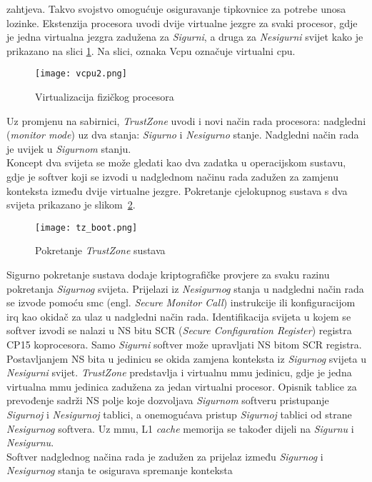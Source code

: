 \documentclass[times, utf8, diplomski, numeric]{fer}
\begin{document}
zahtjeva. Takvo svojstvo omogućuje osiguravanje tipkovnice za potrebe unosa lozinke. Ekstenzija procesora uvodi dvije virtualne
jezgre za svaki procesor, gdje je jedna virtualna jezgra zadužena za \textit{Sigurni}, a druga za \textit{Nesigurni} svijet kako je prikazano na
slici \ref{vcpu}. Na slici, oznaka V\gls{cpu} označuje virtualni \gls{cpu}.
\begin{figure}[H]
  \centering
	\texttt{[image: vcpu2.png]}%
	\caption{Virtualizacija fizičkog procesora}
	\label{vcpu}%
\end{figure}
Uz promjenu na
sabirnici, \textit{TrustZone} uvodi i novi način rada procesora: nadgledni (\textit{monitor mode}) uz dva stanja: \textit{Sigurno}
i \textit{Nesigurno} stanje. Nadgledni način rada je uvijek u \textit{Sigurnom} stanju.\\
Koncept dva svijeta se može gledati kao dva zadatka u operacijskom sustavu, gdje je softver koji se izvodi
u nadglednom načinu rada zadužen za zamjenu konteksta između dvije virtualne jezgre. Pokretanje cjelokupnog sustava s dva
svijeta prikazano je slikom~\ref{tz_boot}.
\begin{figure}[H]
  \centering
	\texttt{[image: tz\_boot.png]}%
	\caption{Pokretanje \textit{TrustZone} sustava}
	\label{tz_boot}%
\end{figure}
Sigurno pokretanje sustava dodaje kriptografičke provjere za svaku razinu pokretanja \textit{Sigurnog} svijeta.
Prijelazi iz \textit{Nesigurnog} stanja u nadgledni
način rada se izvode pomoću \gls{smc} (engl. \textit{Secure Monitor Call}) instrukcije ili konfiguracijom \gls{irq} kao okidač za ulaz
u nadgledni način rada. Identifikacija svijeta u kojem se softver izvodi se nalazi u NS bitu SCR (\textit{Secure
Configuration Register}) registra CP15 koprocesora. Samo \textit{Sigurni} softver može upravljati NS bitom SCR registra. Postavljanjem
NS bita u jedinicu se okida zamjena konteksta iz \textit{Sigurnog} svijeta u \textit{Nesigurni} svijet. \textit{TrustZone} predstavlja i
virtualnu \gls{mmu} jedinicu, gdje je jedna virtualna \gls{mmu} jedinica zadužena za jedan virtualni procesor. Opisnik tablice za prevođenje
sadrži NS polje koje dozvoljava \textit{Sigurnom} softveru pristupanje \textit{Sigurnoj} i \textit{Nesigurnoj} tablici, a onemogućava pristup \textit{Sigurnoj}
tablici od strane \textit{Nesigurnog} softvera. Uz \gls{mmu}, L1 \textit{cache} memorija se također dijeli na \textit{Sigurnu} i \textit{Nesigurnu}.\\
Softver nadglednog načina rada je zadužen za prijelaz između \textit{Sigurnog} i \textit{Nesigurnog} stanja te osigurava spremanje konteksta
\end{document}
